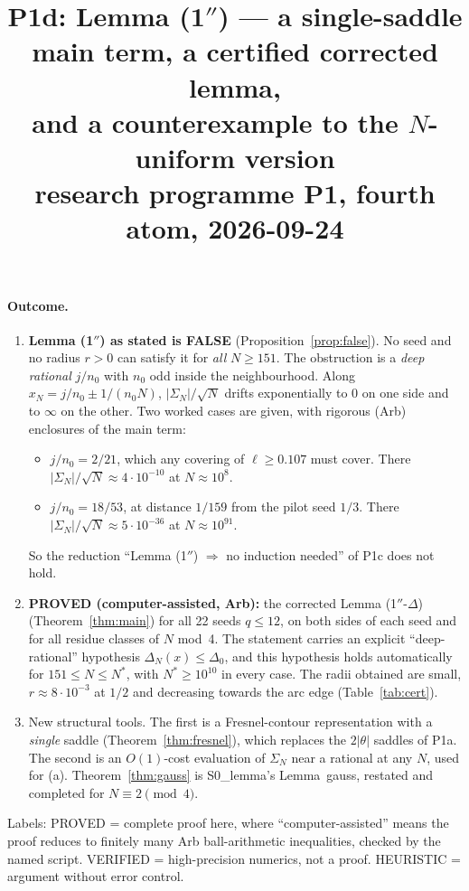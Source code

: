 \documentclass[11pt]{article}
\title{P1d: Lemma (1$''$) --- a single-saddle main term, a certified corrected lemma,\\ and a counterexample to the $N$-uniform version\\ \small research programme P1, fourth atom, 2026-09-24}
\date{}
\theoremstyle{definition}\newtheorem{definition}[theorem]{Definition}
\theoremstyle{remark}\newtheorem{remark}[theorem]{Remark}
\begin{document}
\maketitle

\paragraph{Outcome.}
\begin{enumerate}
\item[(a)] \textbf{Lemma (1$''$) as stated is FALSE} (Proposition~\ref{prop:false}). No seed and no radius $r>0$ can satisfy it for \emph{all} $N\ge151$.
The obstruction is a \emph{deep rational} $j/n_0$ with $n_0$ odd inside the neighbourhood. Along $x_N=j/n_0\pm1/(n_0N)$, $|\Sigma_N|/\sqrt N$ drifts exponentially to $0$ on one side and to $\infty$ on the other.
Two worked cases are given, with rigorous (Arb) enclosures of the main term:
\begin{itemize}
\item $j/n_0=2/21$, which any covering of $\ell\ge0.107$ must cover. There $|\Sigma_N|/\sqrt N\approx4\cdot10^{-10}$ at $N\approx10^8$.
\item $j/n_0=18/53$, at distance $1/159$ from the pilot seed $1/3$. There $|\Sigma_N|/\sqrt N\approx5\cdot10^{-36}$ at $N\approx10^{91}$.
\end{itemize}
So the reduction ``Lemma (1$''$) $\Rightarrow$ no induction needed'' of P1c does not hold.
\item[(b)] \textbf{PROVED (computer-assisted, Arb):} the corrected Lemma (1$''$-$\Delta$) (Theorem~\ref{thm:main}) for all 22 seeds $q\le12$, on both sides of each seed and for all residue classes of $N$ mod~4. The statement carries an explicit ``deep-rational'' hypothesis $\Delta_N(x)\le\Delta_0$, and this hypothesis holds automatically for $151\le N\le N^*$, with $N^*\ge10^{10}$ in every case.
The radii obtained are small, $r\approx 8\cdot10^{-3}$ at $1/2$ and decreasing towards the arc edge (Table~\ref{tab:cert}).
\item[(c)] New structural tools. The first is a Fresnel-contour representation with a \emph{single} saddle (Theorem~\ref{thm:fresnel}), which replaces the $2|\theta|$ saddles of P1a. The second is an $O(1)$-cost evaluation of $\Sigma_N$ near a rational at any $N$, used for (a). Theorem~\ref{thm:gauss} is S0\_lemma's Lemma~gauss, restated and completed for $N\equiv2\pmod4$.
\end{enumerate}
Labels: PROVED = complete proof here, where ``computer-assisted'' means the proof reduces to finitely many Arb ball-arithmetic inequalities, checked by the named script. VERIFIED = high-precision numerics, not a proof. HEURISTIC = argument without error control.
\end{document}
